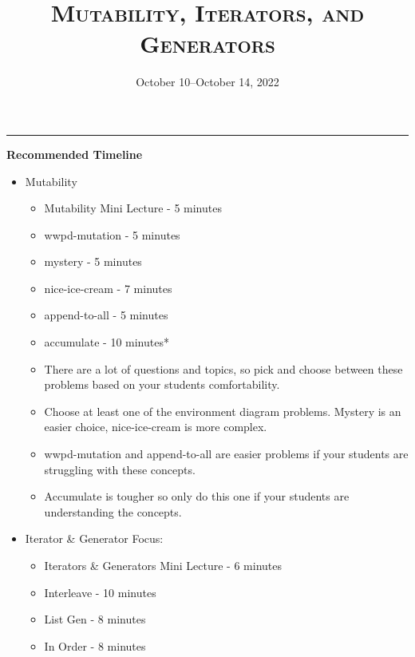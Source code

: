 \documentclass{exam}
\title{\textsc{Mutability, Iterators, and Generators}}
\date{October 10--October 14, 2022}
\begin{document}
\maketitle
\rule{\textwidth}{0.15em}
\fontsize{12}{15}\selectfont


\begin{guide}
    \newline
    \textbf{Recommended Timeline}
    \begin{itemize}
        \item Mutability
        \begin{itemize}
            \item Mutability Mini Lecture - 5 minutes
            \item wwpd-mutation - 5 minutes
            \item mystery - 5 minutes
            \item nice-ice-cream - 7 minutes
            \item append-to-all - 5 minutes
            \item accumulate - 10 minutes*
            \item There are a lot of questions and topics, so pick and choose between these problems based on your students comfortability.
            \item Choose at least one of the environment diagram problems. Mystery is an easier choice, nice-ice-cream is more complex.
            \item wwpd-mutation and append-to-all are easier problems if your students are struggling with these concepts.
            \item Accumulate is tougher so only do this one if your students are understanding the concepts.
        \end{itemize}
        \item Iterator \& Generator Focus:
        \begin{itemize}
            \item Iterators \& Generators Mini Lecture - 6 minutes
            \item Interleave - 10 minutes
            \item List Gen - 8 minutes
            \item In Order - 8 minutes
        \end{itemize}
    \end{itemize}
\end{guide}
\end{document}
